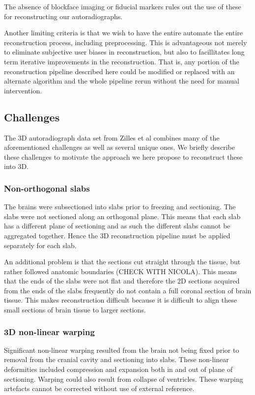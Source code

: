 \documentclass[12pt]{article}
\begin{document}
The absence of blockface imaging or fiducial markers rules out the use of these for reconstructing our autoradiographs.

Another limiting criteria is that we wish to have the entire automate the entire reconstruction process, including preprocessing. This is advantageous not merely to eliminate subjective user biases in reconstruction, but also to facillitates long term iterative improvements in the reconstruction. That is, any portion of the reconstruction pipeline described here could be modified or replaced with an alternate algorithm and the whole pipeline rerun without the need for manual intervention.


\subsection{Challenges}

The 3D autoradiograph data set from Zilles et al \cite{Zilles2002} combines many of the aforementioned challenges as well as several unique ones. We briefly describe these challenges to motivate the approach we here propose to reconstruct these into 3D. 

\subsubsection{Non-orthogonal slabs}

The brains were subsectioned into slabs prior to freezing and sectioning. The slabs were not sectioned along an orthogonal plane. This means that each slab has a different plane of sectioning and as such the different slabs cannot be aggregated together. Hence the 3D reconstruction pipeline must be applied separately for each slab. 

An additional problem is that the sections cut straight through the tissue, but rather followed anatomic boundaries (CHECK WITH NICOLA). This means that the ends of the slabs were not flat and therefore the 2D sections acquired from the ends of the slabs frequently do not contain a full coronal section of brain tissue. This makes reconstruction difficult because it is difficult to align these small sections of brain tissue to larger sections. 

\subsubsection{3D non-linear warping}

Significant non-linear warping resulted from the brain not being fixed prior to removal from the cranial cavity and sectioning into slabs. These non-linear deformities included compression and expansion both in and out of plane of sectioning. Warping could also result from collapse of ventricles. These warping artefacts cannot be corrected without use of external reference. 
\end{document}
